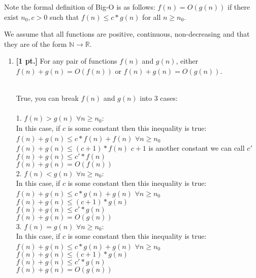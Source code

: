 \documentclass[11pt]{article}
\theoremstyle{definition}
\theoremstyle{theorem}
\newcommand{\solution}{\medskip\noindent{\color{blue}\textbf{Solution:}}}
\begin{document}
Note the formal definition of Big-O is as follows: $f(n) =O(g(n))$ if there exist $n_0, c > 0$ such that $f(n) \leq c*g(n)$ for all $n \geq n_0$.

We assume that all functions are positive, continuous, non-decreasing and that they are of the form $\mathbb{N} \rightarrow \mathbb{R}$.

\begin{enumerate}[label=(\alph*)]


\item \textbf{[1 pt.]} For any pair of functions $f(n)$ and $g(n)$, either $f(n) + g(n) = O(f(n))$ or $f(n) + g(n) = O(g(n))$.

\solution\\
True, you can break $f(n)$ and $g(n)$ into 3 cases: \\~\\
1. $f(n) > g(n)$ \hspace{0.5cm} $\forall n \geq n_0$:\\
In this case, if $c$ is some constant then this inequality is true: \\ 
$f(n) + g(n) \leq c * f(n) + f(n)$ \hspace{0.5cm} $\forall n \geq n_0$ \\
$f(n) + g(n) \leq (c + 1) * f(n)$ \hspace{0.5cm} $c + 1$ is another constant we can call $c'$\\ 
$f(n) + g(n) \leq c' * f(n)$ \\ 
$f(n) + g(n) = O(f(n))$ \\ 

2. $f(n) < g(n)$ \hspace{0.5cm} $\forall n \geq n_0$:\\
In this case, if $c$ is some constant then this inequality is true: \\ 
$f(n) + g(n) \leq c * g(n) + g(n)$ \hspace{0.5cm} $\forall n \geq n_0$ \\
$f(n) + g(n) \leq (c + 1) * g(n)$\\ 
$f(n) + g(n) \leq c' * g(n)$ \\ 
$f(n) + g(n) = O(g(n))$ \\

3. $f(n) = g(n)$ \hspace{0.5cm} $\forall n \geq n_0$:\\
In this case, if $c$ is some constant then this inequality is true: \\ 
$f(n) + g(n) \leq c * g(n) + g(n)$ \hspace{0.5cm} $\forall n \geq n_0$ \\
$f(n) + g(n) \leq (c + 1) * g(n)$\\ 
$f(n) + g(n) \leq c' * g(n)$ \\ 
$f(n) + g(n) = O(g(n))$ \\ 



\end{enumerate}
\end{document}
